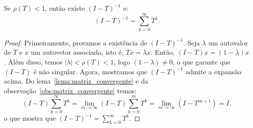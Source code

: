 \begin{lem}\label{lema:inversa}
  Se $\rho(T) < 1$, então existe $(I - T)^{-1}$ e:
  \begin{equation*}
    (I - T)^{-1} = \sum_{k=0}^\infty T^k.
  \end{equation*}
\end{lem}
\begin{proof}
  Primeiramente, provamos a existência de $(I - T)^{-1}$. Seja $\lambda$ um autovalor de $T$ e $x$ um autovetor associado, isto é, $Tx = \lambda x$. Então, $(I-T)x = (1-\lambda)x$. Além disso, temos $|\lambda| < \rho(T) < 1$, logo $(1 - \lambda) \neq 0$, o que garante que $(I - T)$ é não singular.
  Agora, mostramos que $(I - T)^{-1}$ admite a expansão acima. Do lema~\ref{lema:matriz_convergente} e da observação~\ref{obs:matriz_convergente} temos:
  \begin{equation*}
   (I - T)\sum_{k=0}^\infty T^k =  \lim_{m\to\infty} (I - T)\sum_{k=0}^m T^k = \lim_{m\to\infty} (I - T^{m+1}) = I,
  \end{equation*}
o que mostra que $\displaystyle (I - T)^{-1} = \sum_{k=0}^\infty T^k$.
\end{proof}

